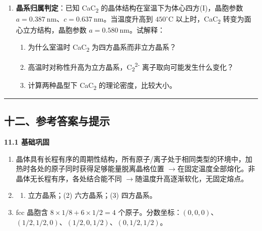 \documentclass[a4paper,11pt]{ctexart}
\providecommand{\tightlist}{\setlength{\itemsep}{0pt}\setlength{\parskip}{0pt}}
\newcommand{\箭}{\ensuremath{\rightarrow}}
\newcommand{\左箭}{\ensuremath{\leftarrow}}
\newcommand{\上箭}{\ensuremath{\uparrow}}
\newcommand{\下箭}{\ensuremath{\downarrow}}
\newcommand{\衡}{\ensuremath{\rightleftharpoons}}
\newcommand{\双箭}{\ensuremath{\leftrightarrow}}
\newcommand{\约等于}{\ensuremath{\approx}}
\newcommand{\小于等于}{\ensuremath{\leq}}
\newcommand{\大于等于}{\ensuremath{\geq}}
\newcommand{\不等于}{\ensuremath{\neq}}
\newcommand{\西格马}{\ensuremath{\sigma}}
\newcommand{\派}{\ensuremath{\pi}}
\begin{document}
\begin{enumerate}
  \begin{enumerate}
  \def\labelenumii{(\arabic{enumii})}
  \tightlist
  \item
    计算每个晶胞中的钨原子数。
  \item
    计算阿伏加德罗常数 \(N_A\)。
  \item
    计算空间利用率(堆积效率)。
  \end{enumerate}
\item
  \textbf{晶系归属判定}：已知 CaC\textsubscript{2} 的晶体结构在室温下为体心四方(I)，晶胞参数 \(a = 0.387\ \mathrm{nm}\)、\(c = 0.637\ \mathrm{nm}\)。当温度升高到 \(450^\circ\mathrm{C}\) 以上时，CaC\textsubscript{2} 转变为面心立方结构，晶胞参数 \(a = 0.580\ \mathrm{nm}\)。试解释：

  \begin{enumerate}
  \def\labelenumii{(\arabic{enumii})}
  \tightlist
  \item
    为什么室温时 CaC\textsubscript{2} 为四方晶系而非立方晶系？
  \item
    高温时对称性升高为立方晶系，C\textsubscript{2}\textsuperscript{2-} 离子取向可能发生什么变化？
  \item
    计算两种晶型下 CaC\textsubscript{2} 的理论密度，比较大小。
  \end{enumerate}
\end{enumerate}

\begin{center}\rule{0.5\linewidth}{0.5pt}\end{center}

\subsection{十二、参考答案与提示}\label{ux5341ux4e8cux53c2ux8003ux7b54ux6848ux4e0eux63d0ux793a}

\textbf{11.1 基础巩固}

\begin{enumerate}
\def\labelenumi{\arabic{enumi}.}
\item
  晶体具有长程有序的周期性结构，所有原子/离子处于相同类型的环境中，加热时各处的原子同时获得足够能量脱离晶格位置 \箭 在固定温度全部熔化。非晶体无长程有序，各处结合能不同 \箭 随温度升高逐渐软化，无固定熔点。
\item
  \begin{enumerate}
  \def\labelenumii{(\arabic{enumii})}
  \tightlist
  \item
    立方晶系；(2) 六方晶系；(3) 四方晶系。
  \end{enumerate}
\item
  fcc 晶胞含 \(8 \times 1/8 + 6 \times 1/2 = 4\) 个原子。分数坐标：\((0, 0, 0)\)、\((1/2, 1/2, 0)\)、\((1/2, 0, 1/2)\)、\((0, 1/2, 1/2)\)。
\end{enumerate}
\end{document}
